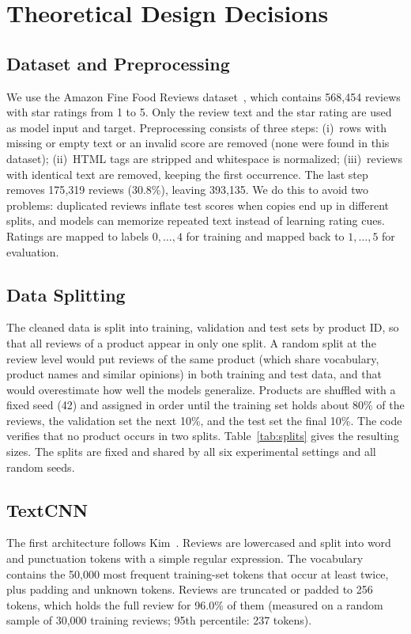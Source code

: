 \section{Theoretical Design Decisions}
\label{sec:design}

\subsection{Dataset and Preprocessing}
We use the Amazon Fine Food Reviews dataset~\cite{amazonfinefoods}, which contains 568{,}454 reviews with star ratings from 1 to 5. Only the review text and the star rating are used as model input and target. Preprocessing consists of three steps: (i)~rows with missing or empty text or an invalid score are removed (none were found in this dataset); (ii)~HTML tags are stripped and whitespace is normalized; (iii)~reviews with identical text are removed, keeping the first occurrence. The last step removes 175{,}319 reviews (30.8\%), leaving 393{,}135. We do this to avoid two problems: duplicated reviews inflate test scores when copies end up in different splits, and models can memorize repeated text instead of learning rating cues. Ratings are mapped to labels $0,\dots,4$ for training and mapped back to $1,\dots,5$ for evaluation.

\subsection{Data Splitting}
The cleaned data is split into training, validation and test sets by product ID, so that all reviews of a product appear in only one split. A random split at the review level would put reviews of the same product (which share vocabulary, product names and similar opinions) in both training and test data, and that would overestimate how well the models generalize. Products are shuffled with a fixed seed (42) and assigned in order until the training set holds about 80\% of the reviews, the validation set the next 10\%, and the test set the final 10\%. The code verifies that no product occurs in two splits. Table~\ref{tab:splits} gives the resulting sizes. The splits are fixed and shared by all six experimental settings and all random seeds.

\subsection{TextCNN}
\label{sec:textcnn}
The first architecture follows Kim~\cite{kim2014}. Reviews are lowercased and split into word and punctuation tokens with a simple regular expression. The vocabulary contains the 50{,}000 most frequent training-set tokens that occur at least twice, plus padding and unknown tokens. Reviews are truncated or padded to 256 tokens, which holds the full review for 96.0\% of them (measured on a random sample of 30{,}000 training reviews; 95th percentile: 237 tokens).

